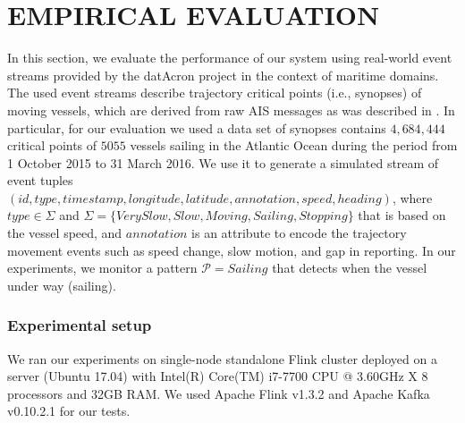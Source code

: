 \section{EMPIRICAL EVALUATION}
\label{sec:results}
In this section, we evaluate the performance of our system using real-world event streams provided by the datAcron project in the context of maritime domains. The used event streams describe trajectory critical points (i.e., synopses) of moving vessels, which are derived from raw AIS messages as was  described in \cite{synopses1}. In particular, for our evaluation we used a data set of synopses contains $4,684,444$ critical points of $5055$ vessels sailing in the Atlantic Ocean during the period from 1 October 2015 to 31 March 2016. We use it to generate a simulated stream of event tuples  $(id,type,timestamp,longitude,latitude,annotation,speed,heading)$,  where $type \in \Sigma$ and $\Sigma=\{VerySlow,Slow,Moving,Sailing,Stopping\}$ that is based on the  vessel speed, and $annotation$ is an attribute to encode the trajectory movement events such as speed change, slow motion, and gap in reporting. In our experiments, we monitor a pattern $\mathcal{P}=Sailing$ that detects when the vessel under way (sailing).


\subsubsection*{Experimental setup} We ran our experiments on single-node standalone Flink cluster deployed on a server (Ubuntu 17.04) with Intel(R) Core(TM) i7-7700 CPU @ 3.60GHz X 8 processors and 32GB RAM. We used Apache Flink v1.3.2 and Apache Kafka v0.10.2.1 for our tests.


